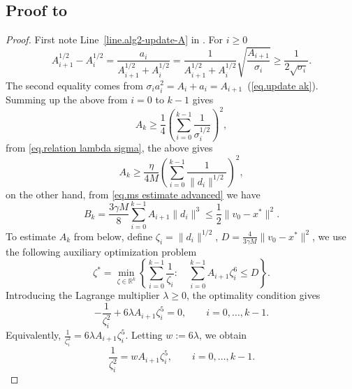 \documentclass{article}
\begin{document}
\subsection*{Proof to }\label{sec.app-c}
\begin{proof}
    First note Line~\ref{line.alg2-update-A} in . For $i\geq 0$
    \begin{equation*}
        A_{i+1}^{1/2}-A_i^{1/2} = \frac{a_i}{A_{i+1}^{1/2}+A_i^{1/2}}=\frac{1}{A_{i+1}^{1/2}+A_i^{1/2}}\sqrt{\frac{A_{i+1}}{\sigma_i}}\geq \frac{1}{2\sqrt{\sigma_i}}.
    \end{equation*}
    The second equality comes from $\sigma_ia_i^2=A_i+a_i=A_{i+1}$~(\eqref{eq.update ak}). Summing up the above from $i=0$ to $k-1$ gives
    \begin{equation*}
        A_k \geq \frac{1}{4} \left (\sum_{i=0}^{k-1}\frac{1}{\sigma_i^{1/2}}\right)^2,
    \end{equation*}
    from \eqref{eq.relation lambda sigma}, the above gives
    \begin{equation}\label{eq.Ak helper 1}
        A_k \geq \frac{\eta}{4M} \left (\sum_{i=0}^{k-1} \frac{1}{\|d_i\|^{1/2}}\right)^2,
    \end{equation}
    on the other hand, from \eqref{eq.ms estimate advanced} we have
    \begin{equation*}
        B_k = \frac{3\gamma M}{8}\sum_{i=0}^{k-1} A_{i+1}\|d_i\|^3 \leq \frac{1}{2}\|v_0-x^*\|^2.
    \end{equation*}
    To estimate $A_k$ from below, define $\zeta_i = \|d_i\|^{1/2}$, $D = \frac{4}{3\gamma M}\|v_0-x^*\|^2$, we use the following auxiliary optimization problem
    \begin{equation*}
        \zeta^*=\min _{\zeta \in \mathbb{R}^k}\left\{\sum_{i=0}^{k-1} \frac{1}{\zeta_i}: \quad \sum_{i=0}^{k-1} A_{i+1} \zeta_i^6 \leq D\right\}.
    \end{equation*}
    Introducing the Lagrange multiplier \(\lambda\ge0\), the optimality condition gives
    \begin{equation*}
        -\frac{1}{\zeta_i^2}
        +
        6\lambda A_{i+1}\zeta_i^5
        =
        0,
        \qquad i=0,\ldots,k-1.
    \end{equation*}
    Equivalently, \(
    \frac{1}{\zeta_i^2}
    =
    6\lambda A_{i+1}\zeta_i^5. \) Letting \(w:=6\lambda\), we obtain
    \begin{equation*}
        \frac{1}{\zeta_i^2}
        =
        w A_{i+1}\zeta_i^5,
        \qquad i=0,\ldots,k-1.

\end{equation*}
\end{proof}
\end{document}
